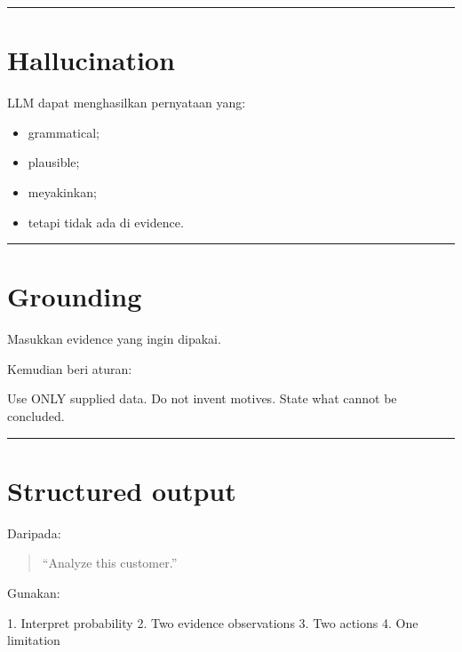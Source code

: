 \documentclass[
  indonesian,
  letterpaper,
  DIV=11,
  numbers=noendperiod]{scrreprt}
\newenvironment{Shaded}{\begin{snugshade}}{\end{snugshade}}
\newcommand{\NormalTok}[1]{\textcolor[rgb]{0.00,0.23,0.31}{#1}}
\providecommand{\tightlist}{%
  \setlength{\itemsep}{0pt}\setlength{\parskip}{0pt}}
\begin{document}
\begin{center}\rule{0.5\linewidth}{0.5pt}\end{center}

\section{Hallucination}\label{hallucination}

LLM dapat menghasilkan pernyataan yang:

\begin{itemize}
\tightlist
\item
  grammatical;
\item
  plausible;
\item
  meyakinkan;
\item
  tetapi tidak ada di evidence.
\end{itemize}

\begin{center}\rule{0.5\linewidth}{0.5pt}\end{center}

\section{Grounding}\label{grounding}

Masukkan evidence yang ingin dipakai.

Kemudian beri aturan:

\begin{Shaded}
\begin{Highlighting}[]
\NormalTok{Use ONLY supplied data.}
\NormalTok{Do not invent motives.}
\NormalTok{State what cannot be concluded.}
\end{Highlighting}
\end{Shaded}

\begin{center}\rule{0.5\linewidth}{0.5pt}\end{center}

\section{Structured output}\label{structured-output}

Daripada:

\begin{quote}
``Analyze this customer.''
\end{quote}

Gunakan:

\begin{Shaded}
\begin{Highlighting}[]
\NormalTok{1. Interpret probability}
\NormalTok{2. Two evidence observations}
\NormalTok{3. Two actions}
\NormalTok{4. One limitation}
\end{Highlighting}
\end{Shaded}
\end{document}
